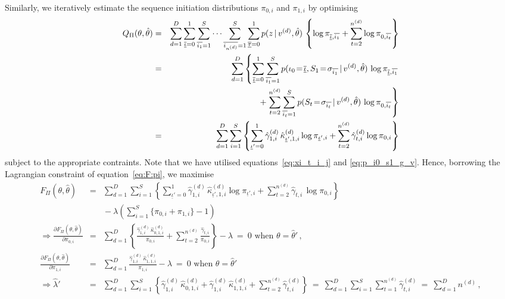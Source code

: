 \documentclass[a4paper]{article}
\newcommand{\ui}{\underline{\iota}}
\newcommand{\ut}{\underline{\tau}}
\begin{document}
Similarly, we iteratively estimate the sequence initiation distributions $\pi_{0,i}$ and $\pi_{1,i}$ by optimising
\begin{eqnarray}
  Q_{\Pi}(\theta,\hat{\theta}) & = & 
\sum_{d=1}^D
\sum_{\overline{\ui}=0}^{1}\sum_{\overline{i_1}=1}^{S}\cdots\sum_{\overline{i_{n^{(d)}}}=1}^{S}
\sum_{\overline{\ut}=0}^{1}
p(z\,|\,v^{(d)},\hat{\theta})\,
\left\{\log\pi_{\overline{\ui},\overline{i_1}}+\sum_{t=2}^{n^{(d)}}\log\pi_{0,\overline{i_{t}}}\right\}
\nonumber\\& = &
\sum_{d=1}^D\left\{
\sum_{\overline{\ui}=0}^{1}\sum_{\overline{i_1}=1}^{S}
p(\iota_0\!=\!\overline{\ui},S_1\!=\!\sigma_{\overline{i_1}}\,|\,v^{(d)},\hat{\theta})\,
\log\pi_{\overline{\ui},\overline{i_1}}\right.
\nonumber\\&&\hspace*{10mm}
+\left.\sum_{t=2}^{n^{(d)}}\sum_{\overline{i_t}=1}^{S}
p(S_t\!=\!\sigma_{\overline{i_t}}\,|\,v^{(d)},\hat{\theta})\,
\log\pi_{0,\overline{i_t}}\right\}
\nonumber\\& = &
\sum_{d=1}^D\sum_{i=1}^{S}\left\{
\sum_{\ui'=0}^{1}
\hat{\gamma}^{(d)}_{1,i}\,\hat{\kappa}_{\ui',1,i}^{(d)}\log\pi_{\ui',i}
+\sum_{t=2}^{n^{(d)}}
\hat{\gamma}_{t,i}^{(d)}\log\pi_{0,i}\right\}
\end{eqnarray}
subject to the appropriate contraints. Note that we have utilised equations~\eqref{eq:xi_t_i_j} and \eqref{eq:p_i0_s1_g_v}.
Hence, borrowing the Lagrangian constraint of equation~\eqref{eq:F:pi}, we maximise
\begin{eqnarray}
  F_{\Pi}(\theta,\hat{\theta}) & = & 
\sum_{d=1}^D\sum_{i=1}^{S}\left\{
\sum_{\ui'=0}^{1}
\hat{\gamma}^{(d)}_{1,i}\,\hat{\kappa}^{(d)}_{\ui',1,i}
\log\pi_{\ui',i}
+\sum_{t=2}^{n^{(d)}}
\hat{\gamma}_{t,i}\,\log\pi_{0,i}\right\}
\nonumber\\&&
{}-\lambda\left(\sum_{i=1}^{S}\{\pi_{0,i}+\pi_{1,i}\}-1\right)
\\
\Rightarrow\frac{\partial F_{\Pi}(\theta,\hat{\theta})}{\partial\pi_{0,i}}
& = &
\sum_{d=1}^D\left\{\frac{\hat{\gamma}^{(d)}_{1,i}\,\hat{\kappa}^{(d)}_{0,1,i}}{\pi_{0,i}}+\sum_{t=2}^{n^{(d)}}\frac{\hat{\gamma}_{t,i}}{\pi_{0,i}}\right\}-\lambda
~=~0\mbox{ when }\theta=\hat{\theta}'\,,
\nonumber\\
\frac{\partial F_{\Pi}(\theta,\hat{\theta})}{\partial\pi_{1,i}}
& = &
\sum_{d=1}^D\frac{\hat{\gamma}^{(d)}_{1,i}\,\hat{\kappa}^{(d)}_{1,1,i}}{\pi_{1,i}}-\lambda
~=~0\mbox{ when }\theta=\hat{\theta}'
\nonumber\\
\Rightarrow\hat{\lambda}' & = & \sum_{d=1}^D
\sum_{i=1}^{S}\left\{\hat{\gamma}^{(d)}_{1,i}\,\hat{\kappa}^{(d)}_{0,1,i}
+\hat{\gamma}^{(d)}_{1,i}\,\hat{\kappa}^{(d)}_{1,1,i}+\sum_{t=2}^{n^{(d)}}\hat{\gamma}^{(d)}_{t,i}\right\}
~=~\sum_{d=1}^D\sum_{i=1}^{S}\sum_{t=1}^{n^{(d)}}\hat{\gamma}^{(d)}_{t,i}~=~\sum_{d=1}^D n^{(d)}\,,
\end{eqnarray}
\end{document}
